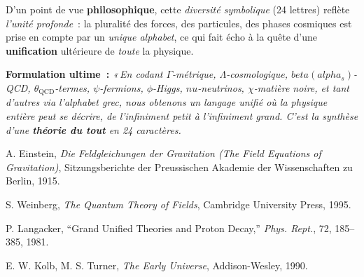 \documentclass[12pt]{article}
\def\nu{nu}%
\def\alpha{alpha}%
\def\beta{beta}%
\begin{document}
D'un point de vue \textbf{philosophique}, cette \emph{diversité symbolique} (24 lettres) 
reflète \emph{l'unité profonde}~: la pluralité des forces, des particules, des phases cosmiques 
est prise en compte par un \emph{unique alphabet}, 
ce qui fait écho à la quête d'une \textbf{unification} ultérieure de \emph{toute} la physique.

\bigskip

\noindent
\textbf{Formulation ultime~:}  
\emph{«\,En codant \(\Gamma\)-métrique, \(\Lambda\)-cosmologique, 
\(\beta(\alpha_s)\)-QCD, \(\theta_{\mathrm{QCD}}\)-termes, 
\(\psi\)-fermions, \(\phi\)-Higgs, \(\nu\)-neutrinos, \(\chi\)-matière noire, 
et tant d’autres via l’alphabet grec, nous obtenons un \og langage unifié \fg{} 
où la physique entière peut se décrire, de l’infiniment petit à l’infiniment grand. 
C’est la synthèse d’une \textbf{théorie du tout} en 24 caractères.}  

\vspace{1em}

\begin{thebibliography}{9}

A. Einstein,
\textit{Die Feldgleichungen der Gravitation (The Field Equations of Gravitation)}, 
Sitzungsberichte der Preussischen Akademie der Wissenschaften zu Berlin, 1915.

S. Weinberg,
\textit{The Quantum Theory of Fields}, 
Cambridge University Press, 1995.

P. Langacker,
``Grand Unified Theories and Proton Decay,''
\textit{Phys. Rept.}, 72, 185--385, 1981.

E. W. Kolb, M. S. Turner,
\textit{The Early Universe},
Addison-Wesley, 1990.

\end{thebibliography}
\end{document}
